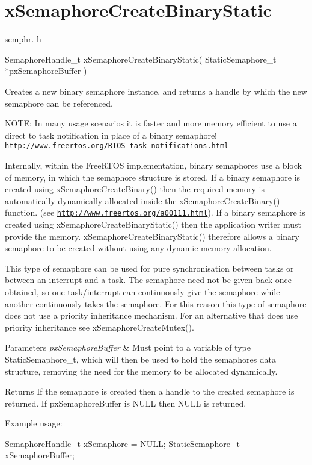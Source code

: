 \hypertarget{group__xSemaphoreCreateBinaryStatic}{}\section{x\+Semaphore\+Create\+Binary\+Static}
\label{group__xSemaphoreCreateBinaryStatic}
semphr. h 
\begin{DoxyPre}SemaphoreHandle\_t xSemaphoreCreateBinaryStatic( StaticSemaphore\_t *pxSemaphoreBuffer )\end{DoxyPre}


Creates a new binary semaphore instance, and returns a handle by which the new semaphore can be referenced.

N\+O\+TE\+: In many usage scenarios it is faster and more memory efficient to use a direct to task notification in place of a binary semaphore! \href{http://www.freertos.org/RTOS-task-notifications.html}{\tt http\+://www.\+freertos.\+org/\+R\+T\+O\+S-\/task-\/notifications.\+html}

Internally, within the Free\+R\+T\+OS implementation, binary semaphores use a block of memory, in which the semaphore structure is stored. If a binary semaphore is created using x\+Semaphore\+Create\+Binary() then the required memory is automatically dynamically allocated inside the x\+Semaphore\+Create\+Binary() function. (see \href{http://www.freertos.org/a00111.html}{\tt http\+://www.\+freertos.\+org/a00111.\+html}). If a binary semaphore is created using x\+Semaphore\+Create\+Binary\+Static() then the application writer must provide the memory. x\+Semaphore\+Create\+Binary\+Static() therefore allows a binary semaphore to be created without using any dynamic memory allocation.

This type of semaphore can be used for pure synchronisation between tasks or between an interrupt and a task. The semaphore need not be given back once obtained, so one task/interrupt can continuously \textquotesingle{}give\textquotesingle{} the semaphore while another continuously \textquotesingle{}takes\textquotesingle{} the semaphore. For this reason this type of semaphore does not use a priority inheritance mechanism. For an alternative that does use priority inheritance see x\+Semaphore\+Create\+Mutex().


\begin{DoxyParams}{Parameters}
{\em px\+Semaphore\+Buffer} & Must point to a variable of type Static\+Semaphore\+\_\+t, which will then be used to hold the semaphore\textquotesingle{}s data structure, removing the need for the memory to be allocated dynamically.\\
\hline
\end{DoxyParams}
\begin{DoxyReturn}{Returns}
If the semaphore is created then a handle to the created semaphore is returned. If px\+Semaphore\+Buffer is N\+U\+LL then N\+U\+LL is returned.
\end{DoxyReturn}
Example usage\+: 
\begin{DoxyPre}
SemaphoreHandle\_t xSemaphore = NULL;
StaticSemaphore\_t xSemaphoreBuffer;\end{DoxyPre}



